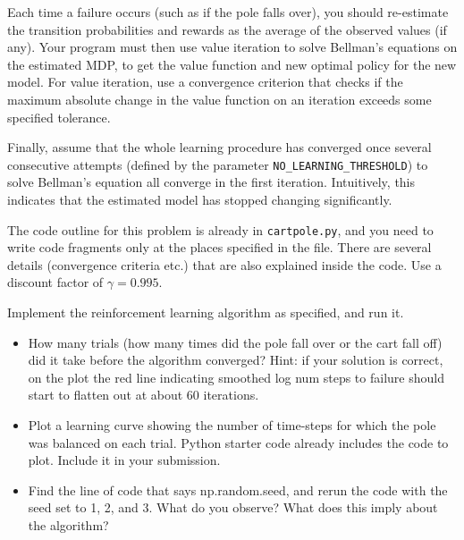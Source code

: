   Each time a failure occurs (such as if the pole falls over), you should 
  re-estimate the transition probabilities and rewards as the average of 
  the observed values (if any).  Your program must then use value iteration 
  to solve Bellman's equations on the estimated MDP, to get the value function 
  and new optimal policy for the new model.  For value iteration, use a 
  convergence criterion that checks if the maximum absolute change in the 
  value function on an iteration exceeds some specified tolerance. 

  Finally, assume that the whole learning procedure has converged 
  once several consecutive attempts (defined by the parameter 
  {\tt NO\_LEARNING\_THRESHOLD}) to solve Bellman's
  equation all converge in the first iteration. Intuitively, this
  indicates that the estimated model has stopped changing significantly.

  The code outline for this problem is already in 
  {\tt cartpole.py}, and you need to write code fragments only at the
  places specified in the file. There are several details (convergence criteria
  etc.) that are also explained inside the code. Use a discount factor
  of $\gamma = 0.995$.  

  Implement the reinforcement learning algorithm as specified, and run it.

\begin{itemize}
\item  How many trials (how many times did the pole fall over or the cart fall off) 
  did it take before the algorithm converged? 
  Hint: if your solution is correct, on the plot the red line indicating smoothed log num 
  steps to failure should start to flatten out at about 60 iterations.

\item  Plot a learning curve showing the number of time-steps for which the
  pole was balanced on each trial. Python starter code already includes the code to plot.
  Include it in your submission.
  
\item  Find the line of code that says np.random.seed, and rerun the code with the seed set to 1, 2, and 3.
       What do you observe? What does this imply about the algorithm?

\end{itemize}

\ifnum{} {
  
} \fi
